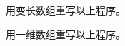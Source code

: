 % 

% 

  

\begin{frame}[fragile]
\begin{biancheng} 
用变长数组重写以上程序。
\end{biancheng}
\end{frame}

\begin{frame}[fragile]
\begin{biancheng} 
用一维数组重写以上程序。
\end{biancheng}
\end{frame}
